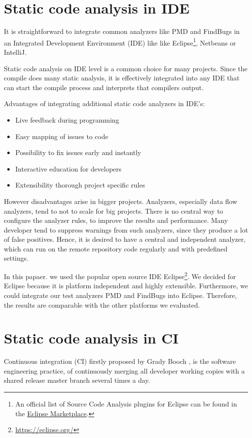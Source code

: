 \documentclass[conference]{IEEEtran}
\begin{document}
\section{Static code analysis in IDE}
\label{sec:static_code_analysis_ide}
It is straightforward to integrate common analyzers like PMD and FindBugs in an Integrated Development Environment (IDE) like like Eclipse\footnote{An official list of Source Code Analysis plugins for Eclipse can be found in the \href{http://marketplace.eclipse.org/taxonomy/term/14,31}{Eclipse Marketplace}.}, Netbeans or IntelliJ.

Static code analysis on IDE level is a common choice for many projects. Since the compile does many static analysis, it is effectively integrated into any IDE that can start the compile process and interprets that compilers output.

Advantages of integrating additional static code analyzers in IDE's:
\begin{itemize}
	\item Live feedback during programming
	\item Easy mapping of issues to code
	\item Possibility to fix issues early and instantly
	\item Interactive education for developers
	\item Extensibility thorough project specific rules
\end{itemize}

However disadvantages arise in bigger projects. Analyzers, especially data flow analyzers, tend to not to scale for big projects. 
There is no central way to configure the analyzer rules, to improve the results and performance.
Many developer tend to suppress warnings from such analyzers, since they produce a lot of false positives.
Hence, it is desired to have a central and independent analyzer, which can run on the remote repository code regularly and with predefined settings.

In this papaer. we used the popular open source IDE Eclipse\footnote{\href{https://eclipse.org/}{https://eclipse.org/}}.
We decided for Eclipse because it is platform independent and highly extensible. Furthermore, we could integrate our test analyzers PMD and FindBugs into Eclipse. Therefore, the results are comparable with the other platforms we evaluated.


\section{Static code analysis in CI}
\label{sec:static_code_analysis_ci}
Continuous integration (CI) firstly proposed by Grady Booch \cite{CI-Definition:Booch:1993}, is the software engineering practice, of continuously merging all developer working copies with a shared release master branch several times a day.
\end{document}
